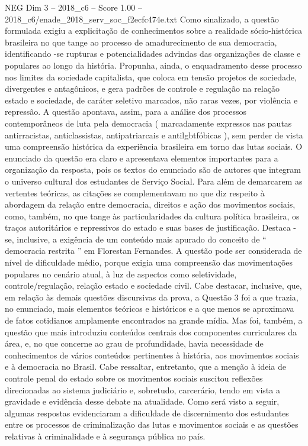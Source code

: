 \begin{textsample}{NEG Dim 3 – 2018\_c6 – Score 1.00 – 2018\_c6/enade\_2018\_serv\_soc\_f2ecfc474e.txt}
Como sinalizado, a questão formulada exigiu a explicitação de conhecimentos sobre a realidade sócio-histórica brasileira no que tange ao processo de amadurecimento de sua democracia, identificando -se rupturas e potencialidades advindas das organizações de classe e populares ao longo da história.
Propunha, ainda, o enquadramento desse processo nos limites da sociedade capitalista, que coloca em tensão projetos de sociedade, divergentes e antagônicos, e gera padrões de controle e regulação na relação estado e sociedade, de caráter seletivo marcados, não raras vezes, por violência e repressão.
A questão apontava, assim, para a análise dos processos contemporâneos de luta pela democracia ( marcadamente expressos nas pautas antirracistas, anticlassistas, antipatriarcais e antilgbtfóbicas ), sem perder de vista uma compreensão histórica da experiência brasileira em torno das lutas sociais.
O enunciado da questão era claro e apresentava elementos importantes para a organização da resposta, pois os textos do enunciado são de autores que integram o universo cultural dos estudantes de Serviço Social.
Para além de demarcarem as vertentes teóricas, as citações se complementavam no que diz respeito à abordagem da relação entre democracia, direitos e ação dos movimentos sociais, como, também, no que tange às particularidades da cultura política brasileira, os traços autoritários e repressivos do estado e suas bases de justificação.
Destaca -se, inclusive, a exigência de um conteúdo mais apurado do conceito de “ democracia restrita ” em Florestan Fernandes.
A questão pode ser considerada de nível de dificuldade médio, porque exigia uma compreensão das movimentações populares no cenário atual, à luz de aspectos como seletividade, controle/regulação, relação estado e sociedade civil.
Cabe destacar, inclusive, que, em relação às demais questões discursivas da prova, a Questão 3 foi a que trazia, no enunciado, mais elementos teóricos e históricos e a que menos se aproximava de fatos cotidianos amplamente encontrados na grande mídia.
Mas foi, também, a questão que mais introduziu conteúdos centrais dos componentes curriculares da área, e, no que concerne ao grau de profundidade, havia necessidade de conhecimentos de vários conteúdos pertinentes à história, aos movimentos sociais e à democracia no Brasil.
Cabe ressaltar, entretanto, que a menção à ideia de controle penal do estado sobre os movimentos sociais suscitou reflexões direcionadas ao sistema judiciário e, sobretudo, carcerário, tendo em vista a gravidade e evidência desse debate na atualidade.
Como será visto a seguir, algumas respostas evidenciaram a dificuldade de discernimento dos estudantes entre os processos de criminalização das lutas e movimentos sociais e as questões relativas à criminalidade e à segurança pública no país.

\end{textsample}
